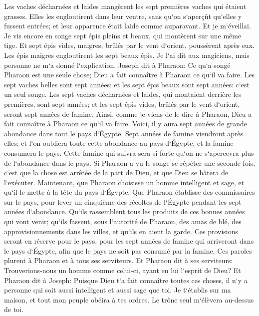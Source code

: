 \verse Les vaches décharnées et laides mangèrent les sept premières vaches qui étaient grasses. 
\verse Elles les engloutirent dans leur ventre, sans qu`on s`aperçût qu`elles y fussent entrées; et leur apparence était laide comme auparavant. Et je m`éveillai. 
\verse Je vis encore en songe sept épis pleins et beaux, qui montèrent sur une même tige. 
\verse Et sept épis vides, maigres, brûlés par le vent d`orient, poussèrent après eux. 
\verse Les épis maigres engloutirent les sept beaux épis. Je l`ai dit aux magiciens, mais personne ne m`a donné l`explication. 
\verse Joseph dit à Pharaon: Ce qu`a songé Pharaon est une seule chose; Dieu a fait connaître à Pharaon ce qu`il va faire. 
\verse Les sept vaches belles sont sept années: et les sept épis beaux sont sept années: c`est un seul songe. 
\verse Les sept vaches décharnées et laides, qui montaient derrière les premières, sont sept années; et les sept épis vides, brûlés par le vent d`orient, seront sept années de famine. 
\verse Ainsi, comme je viens de le dire à Pharaon, Dieu a fait connaître à Pharaon ce qu`il va faire. 
\verse Voici, il y aura sept années de grande abondance dans tout le pays d`Égypte. 
\verse Sept années de famine viendront après elles; et l`on oubliera toute cette abondance au pays d`Égypte, et la famine consumera le pays. 
\verse Cette famine qui suivra sera si forte qu`on ne s`apercevra plus de l`abondance dans le pays. 
\verse Si Pharaon a vu le songe se répéter une seconde fois, c`est que la chose est arrêtée de la part de Dieu, et que Dieu se hâtera de l`exécuter. 
\verse Maintenant, que Pharaon choisisse un homme intelligent et sage, et qu`il le mette à la tête du pays d`Égypte. 
\verse Que Pharaon établisse des commissaires sur le pays, pour lever un cinquième des récoltes de l`Égypte pendant les sept années d`abondance. 
\verse Qu`ils rassemblent tous les produits de ces bonnes années qui vont venir; qu`ils fassent, sous l`autorité de Pharaon, des amas de blé, des approvisionnements dans les villes, et qu`ils en aient la garde. 
\verse Ces provisions seront en réserve pour le pays, pour les sept années de famine qui arriveront dans le pays d`Égypte, afin que le pays ne soit pas consumé par la famine. 
\verse Ces paroles plurent à Pharaon et à tous ses serviteurs. 
\verse Et Pharaon dit à ses serviteurs: Trouverions-nous un homme comme celui-ci, ayant en lui l`esprit de Dieu? 
\verse Et Pharaon dit à Joseph: Puisque Dieu t`a fait connaître toutes ces choses, il n`y a personne qui soit aussi intelligent et aussi sage que toi. 
\verse Je t`établis sur ma maison, et tout mon peuple obéira à tes ordres. Le trône seul m`élèvera au-dessus de toi. 
